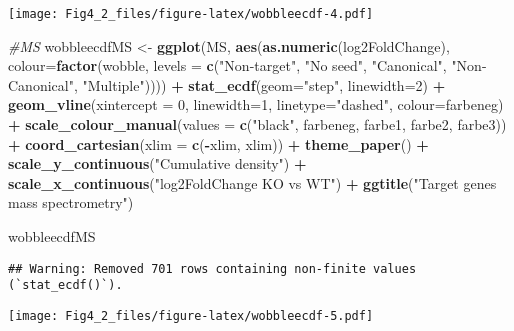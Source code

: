 \documentclass[
]{article}
\newenvironment{Shaded}{\begin{snugshade}}{\end{snugshade}}
\newcommand{\AttributeTok}[1]{\textcolor[rgb]{0.13,0.29,0.53}{#1}}
\newcommand{\CommentTok}[1]{\textcolor[rgb]{0.56,0.35,0.01}{\textit{#1}}}
\newcommand{\DecValTok}[1]{\textcolor[rgb]{0.00,0.00,0.81}{#1}}
\newcommand{\FunctionTok}[1]{\textcolor[rgb]{0.13,0.29,0.53}{\textbf{#1}}}
\newcommand{\NormalTok}[1]{#1}
\newcommand{\OtherTok}[1]{\textcolor[rgb]{0.56,0.35,0.01}{#1}}
\newcommand{\SpecialCharTok}[1]{\textcolor[rgb]{0.81,0.36,0.00}{\textbf{#1}}}
\newcommand{\StringTok}[1]{\textcolor[rgb]{0.31,0.60,0.02}{#1}}
\begin{document}
\texttt{[image: Fig4\_2\_files/figure-latex/wobbleecdf-4.pdf]}

\begin{Shaded}
\begin{Highlighting}[]
\CommentTok{\#MS}
\NormalTok{wobbleecdfMS }\OtherTok{\textless{}{-}} \FunctionTok{ggplot}\NormalTok{(MS, }\FunctionTok{aes}\NormalTok{(}\FunctionTok{as.numeric}\NormalTok{(log2FoldChange), }\AttributeTok{colour=}\FunctionTok{factor}\NormalTok{(wobble, }\AttributeTok{levels =} \FunctionTok{c}\NormalTok{(}\StringTok{"Non{-}target"}\NormalTok{, }\StringTok{"No seed"}\NormalTok{, }\StringTok{"Canonical"}\NormalTok{, }\StringTok{"Non{-}Canonical"}\NormalTok{, }\StringTok{"Multiple"}\NormalTok{)))) }\SpecialCharTok{+} 
  \FunctionTok{stat\_ecdf}\NormalTok{(}\AttributeTok{geom=}\StringTok{"step"}\NormalTok{, }\AttributeTok{linewidth=}\DecValTok{2}\NormalTok{) }\SpecialCharTok{+}
  \FunctionTok{geom\_vline}\NormalTok{(}\AttributeTok{xintercept =} \DecValTok{0}\NormalTok{, }\AttributeTok{linewidth=}\DecValTok{1}\NormalTok{, }\AttributeTok{linetype=}\StringTok{"dashed"}\NormalTok{, }\AttributeTok{colour=}\NormalTok{farbeneg) }\SpecialCharTok{+}
  \FunctionTok{scale\_colour\_manual}\NormalTok{(}\AttributeTok{values =} \FunctionTok{c}\NormalTok{(}\StringTok{"black"}\NormalTok{, farbeneg, farbe1, farbe2, farbe3)) }\SpecialCharTok{+}
  \FunctionTok{coord\_cartesian}\NormalTok{(}\AttributeTok{xlim =} \FunctionTok{c}\NormalTok{(}\SpecialCharTok{{-}}\NormalTok{xlim, xlim)) }\SpecialCharTok{+} 
  \FunctionTok{theme\_paper}\NormalTok{() }\SpecialCharTok{+}
  \FunctionTok{scale\_y\_continuous}\NormalTok{(}\StringTok{"Cumulative density"}\NormalTok{) }\SpecialCharTok{+} \FunctionTok{scale\_x\_continuous}\NormalTok{(}\StringTok{"log2FoldChange KO vs WT"}\NormalTok{) }\SpecialCharTok{+}
  \FunctionTok{ggtitle}\NormalTok{(}\StringTok{"Target genes mass spectrometry"}\NormalTok{)}

\NormalTok{wobbleecdfMS}
\end{Highlighting}
\end{Shaded}

\begin{verbatim}
## Warning: Removed 701 rows containing non-finite values (`stat_ecdf()`).
\end{verbatim}

\texttt{[image: Fig4\_2\_files/figure-latex/wobbleecdf-5.pdf]}
\end{document}
